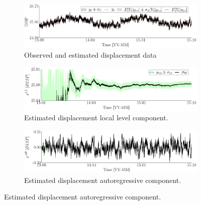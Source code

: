 \begin{figure}[h!]
\centering
\begin{subfigure}{\linewidth}
\includegraphics[width=0.9\linewidth]{./docfigs/Example_DISPTEMPSIM/optim_param_default_initialhiddenstate/DISP_ObservedPredicted.pdf}
\caption{Observed and estimated displacement data} 
\end{subfigure}
\begin{subfigure}{\linewidth}
\includegraphics[width=0.9\linewidth]{./docfigs/Example_DISPTEMPSIM/optim_param_default_initialhiddenstate/DISP_LL_1.pdf}
\caption{Estimated displacement local level component.}
\end{subfigure}
\begin{subfigure}{\linewidth}
\includegraphics[width=0.9\linewidth]{./docfigs/Example_DISPTEMPSIM/optim_param_default_initialhiddenstate/DISP_AR_2.pdf}
\caption{Estimated displacement autoregressive component.}
\end{subfigure}
\end{figure}
